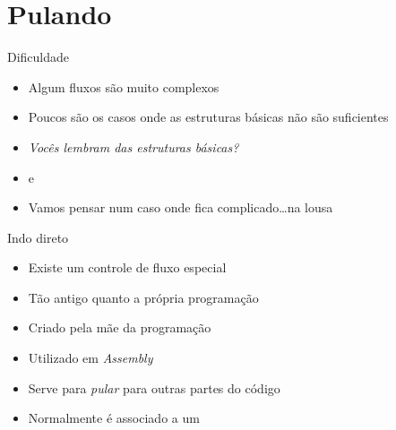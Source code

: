 \documentclass[14pt]{beamer}
\subtitle{Faça o que eu digo}
\begin{document}
	
	\begin{frame}
		\titlepage
	\end{frame}

	\begin{frame}
		\tableofcontents
	\end{frame}

	\section{Pulando}
		\begin{frame}{Dificuldade}
			\begin{itemize}
				\presentationPause\item Algum fluxos são muito complexos
				\presentationPause\item Poucos são os casos onde as estruturas básicas não são suficientes
				\presentationPause\item \textit{Vocês lembram das estruturas básicas?}
				\presentationPause\item {} e \basicCode{while}
				\presentationPause\item Vamos pensar num caso onde fica complicado\dots\presentationPause na lousa
			\end{itemize}
		\end{frame}

		\begin{frame}{Indo direto}
			\begin{itemize}
				\presentationPause\item Existe um controle de fluxo especial
				\presentationPause\item Tão antigo quanto a própria programação
				\presentationPause\item Criado pela mãe da programação
				\presentationPause\item Utilizado em \textit{Assembly}
				\presentationPause\item Serve para \emph{pular} para outras partes do código
				\presentationPause\item Normalmente é associado a um \basicCode{if}
			\end{itemize}
		\end{frame}
\end{document}
